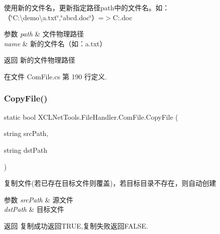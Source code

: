 使用新的文件名，更新指定路径path中的文件名。如：（\char`\"{}\+C\+:\textbackslash{}demo\textbackslash{}a.\+txt\char`\"{},\char`\"{}abcd.\+doc\char`\"{}）=$>$C\+:.doc 


\begin{DoxyParams}{参数}
{\em path} & 文件物理路径\\
\hline
{\em name} & 新的文件名（如：a.\+txt）\\
\hline
\end{DoxyParams}
\begin{DoxyReturn}{返回}
新的文件物理路径
\end{DoxyReturn}


在文件 Com\+File.\+cs 第 190 行定义.

\mbox{\label{class_x_c_l_net_tools_1_1_file_handler_1_1_com_file_ae8479a1330655aa229ed6222410b7823}} 
\subsubsection{\texorpdfstring{Copy\+File()}{CopyFile()}\hspace{0.1cm}{\footnotesize\ttfamily [1/2]}}
{\footnotesize\ttfamily static bool X\+C\+L\+Net\+Tools.\+File\+Handler.\+Com\+File.\+Copy\+File (\begin{DoxyParamCaption}\item[{string}]{src\+Path,  }\item[{string}]{dst\+Path }\end{DoxyParamCaption})\hspace{0.3cm}{\ttfamily [static]}}



复制文件(若已存在目标文件则覆盖)，若目标目录不存在，则自动创建 


\begin{DoxyParams}{参数}
{\em src\+Path} & 源文件\\
\hline
{\em dst\+Path} & 目标文件\\
\hline
\end{DoxyParams}
\begin{DoxyReturn}{返回}
复制成功返回\+T\+R\+UE,复制失败返回\+F\+A\+L\+SE.
\end{DoxyReturn}


